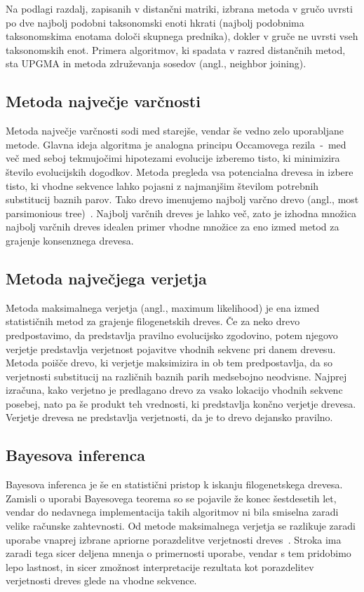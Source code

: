 \documentclass[a4paper, 12pt]{book}
\begin{document}
\noindent Na podlagi razdalj, zapisanih v distančni matriki, izbrana metoda v gručo 
uvrsti po dve najbolj podobni taksonomski enoti hkrati (najbolj
podobnima taksonomskima enotama določi skupnega prednika), dokler v 
gruče ne uvrsti vseh taksonomskih enot. Primera algoritmov, ki spadata v razred 
distančnih metod, sta UPGMA in metoda združevanja sosedov (angl., neighbor joining). 

\subsection{Metoda največje varčnosti}
Metoda največje varčnosti sodi med starejše, vendar še vedno zelo uporabljane 
metode. Glavna ideja algoritma je analogna principu Occamovega rezila~-~med več 
med seboj tekmujočimi hipotezami evolucije izberemo tisto, ki minimizira število 
evolucijskih dogodkov. Metoda pregleda vsa potencialna drevesa in izbere tisto, 
ki vhodne sekvence lahko pojasni z najmanjšim številom potrebnih substitucij 
baznih parov. Tako drevo imenujemo najbolj varčno drevo 
(angl., most parsimonious tree)~\cite{parsimony}. Najbolj varčnih dreves je lahko
več, zato je izhodna množica najbolj varčnih dreves idealen primer vhodne množice 
za eno izmed metod za grajenje konsenznega drevesa.

\subsection{Metoda največjega verjetja}
Metoda maksimalnega verjetja (angl., maximum likelihood) je ena izmed statističnih
metod za grajenje filogenetskih dreves. Če za neko drevo predpostavimo, da predstavlja
pravilno evolucijsko zgodovino, potem njegovo verjetje predstavlja verjetnost 
pojavitve vhodnih sekvenc pri danem drevesu. Metoda poišče drevo, ki verjetje 
maksimizira in ob tem predpostavlja, da so verjetnosti substitucij na različnih 
baznih parih medsebojno neodvisne. Najprej izračuna, kako verjetno je predlagano 
drevo za vsako lokacijo vhodnih sekvenc posebej, nato pa še produkt teh vrednosti, 
ki predstavlja končno verjetje drevesa. Verjetje drevesa ne predstavlja verjetnosti, 
da je to drevo dejansko pravilno. 

\subsection{Bayesova inferenca}
Bayesova inferenca je še en statistični pristop k iskanju filogenetskega drevesa. 
Zamisli o uporabi Bayesovega teorema so se pojavile že konec šestdesetih let, 
vendar do nedavnega implementacija takih algoritmov ni bila smiselna zaradi velike
računske zahtevnosti. Od metode maksimalnega verjetja se razlikuje zaradi uporabe 
vnaprej izbrane apriorne porazdelitve verjetnosti dreves~\cite{fel}. Stroka ima 
zaradi tega sicer deljena mnenja o primernosti uporabe, vendar s tem pridobimo 
lepo lastnost, in sicer zmožnost interpretacije rezultata kot porazdelitev 
verjetnosti dreves glede na vhodne sekvence.
\end{document}
